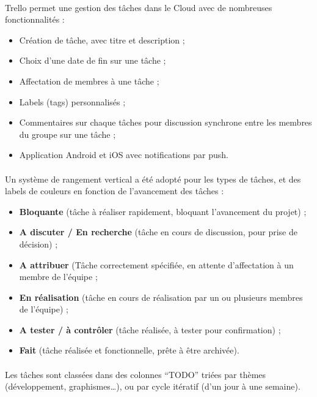 \paragraph{}
Trello permet une gestion des tâches dans le Cloud avec de nombreuses fonctionnalités :
\begin{itemize}
\item Création de tâche, avec titre et description ;
\item Choix d’une date de fin sur une tâche ;
\item Affectation de membres à une tâche ;
\item Labels (tags) personnalisés ;
\item Commentaires sur chaque tâches pour discussion synchrone entre les membres du groupe sur une tâche ;
\item Application Android et iOS avec notifications par push.
\end{itemize}

\paragraph{}
Un système de rangement vertical a été adopté pour les types de tâches, et des labels de couleurs en fonction de l’avancement des tâches :

\begin{itemize}
\item \textbf{Bloquante} (tâche à réaliser rapidement, bloquant l’avancement du projet) ;
\item \textbf{A discuter / En recherche} (tâche en cours de discussion, pour prise de décision) ;
\item \textbf{A attribuer} (Tâche correctement spécifiée, en attente d’affectation à un membre de l’équipe ;
\item \textbf{En réalisation} (tâche en cours de réalisation par un ou plusieurs membres de l’équipe) ;
\item \textbf{A tester / à contrôler} (tâche réalisée, à tester pour confirmation) ;
\item \textbf{Fait} (tâche réalisée et fonctionnelle, prête à être archivée).
\end{itemize}

\paragraph{}
Les tâches sont classées dans des colonnes “TODO” triées par thèmes (développement, graphismes…), ou par cycle itératif (d’un jour à une semaine).

